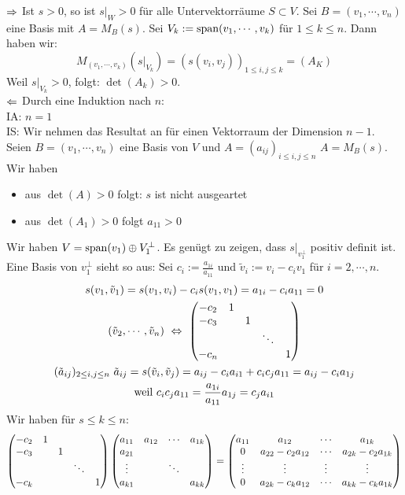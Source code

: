 \begin{Bew}
  $\Rightarrow$ Ist $s>0$, so ist $s|_W>0$ für alle Untervektorräume $S\subset V$. Sei $B=(v_1,\cdots,v_n)$ eine Basis mit $A=M_B(s)$. Sei $V_k:=\operatorname{span}(v_1,\cdots,v_k)$ für $1\leq k\leq n$. Dann haben wir:
  \[M_{(v_1,\cdots,v_k)}\left( s|_{V_k} \right)=\left( s(v_i,v_j) \right)_{1\leq i,j\leq k}=\left( A_K \right)\]
  Weil $s|_{V_k}>0$, folgt: $\det(A_k)>0$.\\
  $\Leftarrow$ Durch eine Induktion nach $n$:\\
  IA: $n=1$\\
  IS: Wir nehmen das Resultat an für einen Vektorraum der Dimension $n-1$. Seien $B=(v_1,\cdots,v_n)$ eine Basis von $V$ und $A=(a_{ij})_{i\leq i,j\leq n}$ $A=M_B(s)$. Wir haben
  \begin{itemize}
    \item aus $\det(A)>0$ folgt: $s$ ist nicht ausgeartet
    \item aus $\det(A_1)>0$ folgt $a_{11}>0$
  \end{itemize}
  Wir haben $V=\operatorname{span}(v_1)\oplus V^\perp_1$. Es genügt zu zeigen, dass $s|_{v^\perp_1}$ positiv definit ist. Eine Basis von $v^\perp_1$ sieht so aus: Sei $c_i:=\frac{a_{1i}}{a_{11}}$ und $\tilde v_i:=v_i-c_iv_1$ für $i=2,\cdots,n$.
  \begin{gather*}
  s(v_1,\tilde v_1)=s(v_1,v_i)-c_is(v_1,v_1)=a_{1i}-c_ia_{11}=0\\
  (\tilde v_2,\cdots,\tilde v_n)\ \Lra\ \Mx{-c_2&1&&&\\-c_3&&1&&\\&&&\ddots&\\-c_n&&&&1}\\
  (\tilde a_{ij})_{2\leq i,j\leq n}\ \tilde a_{ij}=s(\tilde v_i,\tilde v_j)=a_{ij}-c_ia_{i1}+c_ic_ja_{11}=a_{ij}-c_ia_{1j}\\
  \text{weil }c_ic_ja_{11}=\frac{a_{1i}}{a_{11}}a_{1j}=c_ja_{i1}
  \end{gather*}
  Wir haben für $s\leq k\leq n$:
  \begin{gather*}
    \Mx{-c_2&1&&&\\-c_3&&1&&\\&&&\ddots&\\-c_k&&&&1}\Mx{a_{11}&a_{12}&\cdots&a_{1k}\\a_{21}&&&\\\vdots&&\ddots&\\a_{k1}&&&a_{kk}}=\Mx{a_{11}&a_{12}&\cdots&a_{1k}\\0&a_{22}-c_2a_{12}&\cdots&a_{2k}-c_2a_{1k}\\\vdots&\vdots&\vdots&\vdots\\0&a_{2k}-c_ka_{12}&\cdots&a_{kk}-c_ka_{1k}}\\

\end{gather*}
\end{Bew}
